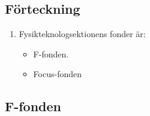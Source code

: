 \documentclass[11pt,a4paper]{article}
\begin{document}
\subsection{Förteckning}

\begin{enumerate}[\thesubsection .1]
  \item Fysikteknologsektionens fonder är:
    \begin{itemize}
      \item F-fonden.
	  \item Focus-fonden
    \end{itemize}
\end{enumerate}

\subsection{F-fonden}
\end{document}

